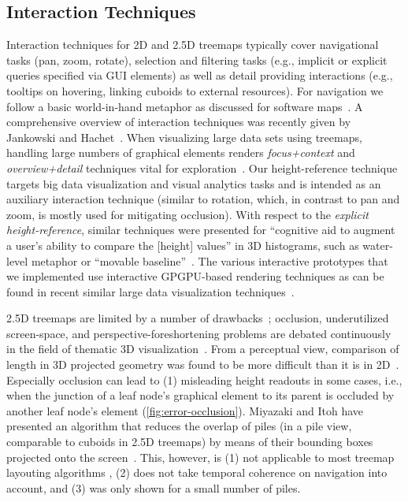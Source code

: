\documentclass[sigconf]{acmart}
\begin{document}
\subsection{Interaction Techniques}
Interaction techniques for 2D and 2.5D treemaps typically cover navigational tasks (pan, zoom, rotate), selection and filtering tasks (e.g., implicit or explicit queries specified via GUI elements) as well as detail providing interactions (e.g., tooltips on hovering, linking cuboids to external resources).
For navigation we follow a basic world-in-hand metaphor as discussed for software maps~\cite{Limberger2013web}.
A comprehensive overview of interaction techniques was recently given by Jankowski and Hachet~\cite{Jankowski2015}.
When visualizing large data sets using treemaps, handling large numbers of graphical elements renders \emph{focus+context} and \emph{overview+detail} techniques vital for exploration~\cite{Hauser2006}.
Our height-reference technique targets big data visualization and visual analytics tasks and is intended as an auxiliary interaction technique (similar to rotation, which, in contrast to pan and zoom, is mostly used for mitigating occlusion).
With respect to the \emph{explicit height-reference}, similar techniques were presented for \enquote{cognitive aid to augment a user's ability to compare the [height] values} in 3D histograms, such as water-level metaphor or \enquote{movable baseline}~\cite{yi2007toward}. %
The various interactive prototypes that we implemented use interactive GPGPU-based rendering techniques as can be found in recent similar large data visualization techniques~\cite{Sud2010,Trapp2013}.

2.5D treemaps are limited by a number of drawbacks~\cite{Schulz2011,VanWijk2003}; occlusion, underutilized screen-space, and perspective-foreshortening problems are debated continuously in the field of thematic 3D visualization~\cite{Elmqvist2008,Roehlig2016}.
From a perceptual view, comparison of length in 3D projected geometry was found to be more difficult than it is in 2D~\cite{norman1996visual}.
Especially occlusion can lead to (1) misleading height readouts in some cases, i.e., when the junction of a leaf node's graphical element to its parent is occluded by another leaf node's element (\autoref{fig:error-occlusion}).
Miyazaki and Itoh have presented an algorithm that reduces the overlap of piles (in a pile view, comparable to cuboids in 2.5D treemaps) by means of their bounding boxes projected onto the screen~\cite{Miyazaki2009occlusion}.
This, however, is (1) not applicable to most treemap layouting algorithms \cite{Hahn2017hybrid}, (2) does not take temporal coherence on navigation into account, and (3) was only shown for a small number of piles.
\end{document}
